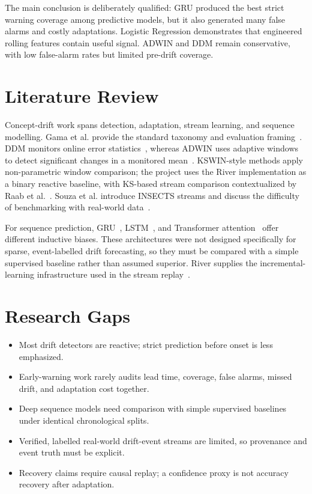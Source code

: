 \documentclass[10pt,twocolumn]{article}
\begin{document}
The main conclusion is deliberately qualified: GRU produced the best strict warning coverage among predictive models, but it also generated many false alarms and costly adaptations. Logistic Regression demonstrates that engineered rolling features contain useful signal. ADWIN and DDM remain conservative, with low false-alarm rates but limited pre-drift coverage.

\section{Literature Review}
Concept-drift work spans detection, adaptation, stream learning, and sequence modelling. Gama et al. provide the standard taxonomy and evaluation framing~\cite{gama2014}. DDM monitors online error statistics~\cite{gama2004}, whereas ADWIN uses adaptive windows to detect significant changes in a monitored mean~\cite{bifet2007}. KSWIN-style methods apply non-parametric window comparison; the project uses the River implementation as a binary reactive baseline, with KS-based stream comparison contextualized by Raab et al.~\cite{raab2020}. Souza et al. introduce INSECTS streams and discuss the difficulty of benchmarking with real-world data~\cite{souza2020}.

For sequence prediction, GRU~\cite{cho2014}, LSTM~\cite{hochreiter1997}, and Transformer attention~\cite{vaswani2017} offer different inductive biases. These architectures were not designed specifically for sparse, event-labelled drift forecasting, so they must be compared with a simple supervised baseline rather than assumed superior. River supplies the incremental-learning infrastructure used in the stream replay~\cite{montiel2021}.

\section{Research Gaps}
\begin{itemize}
\item Most drift detectors are reactive; strict prediction before onset is less emphasized.
\item Early-warning work rarely audits lead time, coverage, false alarms, missed drift, and adaptation cost together.
\item Deep sequence models need comparison with simple supervised baselines under identical chronological splits.
\item Verified, labelled real-world drift-event streams are limited, so provenance and event truth must be explicit.
\item Recovery claims require causal replay; a confidence proxy is not accuracy recovery after adaptation.
\end{itemize}
\end{document}
